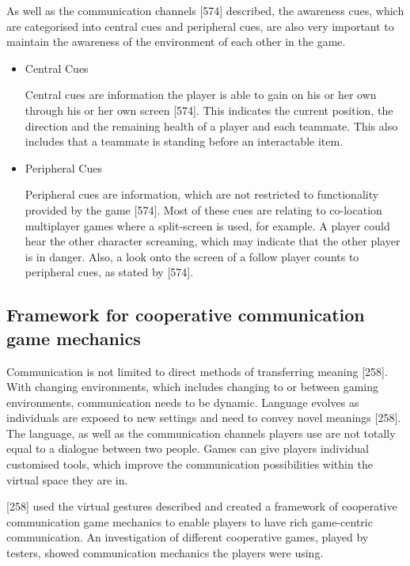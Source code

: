 As well as the communication channels \textcite{Cheung2012CommunicationGaming}[574] described, the awareness cues, which are categorised into central cues and peripheral cues, are also very important to maintain the awareness of the environment of each other in the game. 
\begin{itemize}
    \item Central Cues 
    
    Central cues are information the player is able to gain on his or her own through his or her own screen \autocite{Cheung2012CommunicationGaming}[574]. This indicates the current position, the direction and the remaining health of a player and each teammate. This also includes that a teammate is standing before an interactable item.
    \item Peripheral Cues
    
    Peripheral cues are information, which are not restricted to functionality provided by the game \autocite{Cheung2012CommunicationGaming}[574]. Most of these cues are relating to co-location multiplayer games where a split-screen is used, for example. A player could hear the other character screaming, which may indicate that the other player is in danger. Also, a look onto the screen of a follow player counts to peripheral cues, as stated by \textcite{Cheung2012CommunicationGaming}[574].
\end{itemize}



\subsection{Framework for cooperative communication game mechanics}
\label{section:Framework for cooperative communication game mechanics}

Communication is not limited to direct methods of transferring meaning \textcite{Toups2014ATheory}[258]. With changing environments, which includes
changing to or between gaming environments, communication needs to be dynamic. Language evolves as individuals are exposed to new settings and need to convey novel meanings \textcite{Toups2014ATheory}[258].
The language, as well as the communication channels players use are not totally equal to a dialogue between two people. Games can give players individual customised tools, which improve the communication possibilities within the virtual space they are in. 

\textcite{Toups2014ATheory}[258] used the virtual gestures \textcite{Cheung2012CommunicationGaming} described and created a framework of cooperative communication game mechanics to enable players to have rich game-centric communication.  
An investigation of different cooperative games, played by testers, showed communication mechanics the players were using. 

